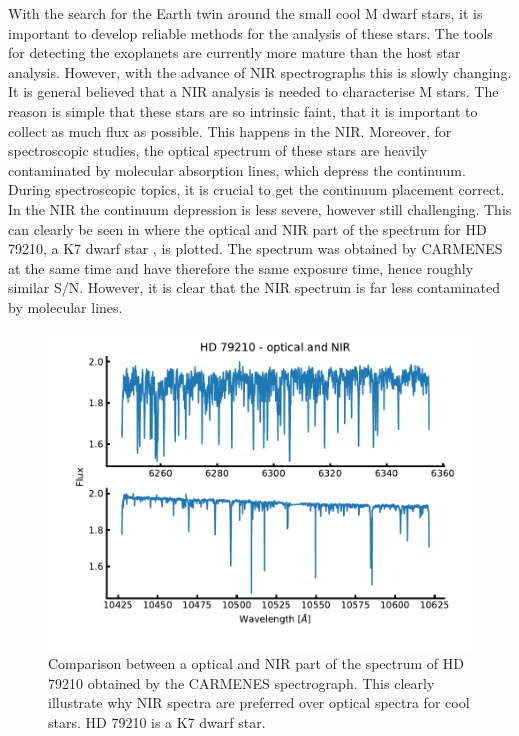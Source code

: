 With the search for the Earth twin around the small cool M dwarf stars, it is important to develop
reliable methods for the analysis of these stars. The tools for detecting the exoplanets are
currently more mature than the host star analysis. However, with the advance of NIR spectrographs
this is slowly changing. It is general believed that a NIR analysis is needed to characterise M
stars. The reason is simple that these stars are so intrinsic faint, that it is important to collect
as much flux as possible. This happens in the NIR. Moreover, for spectroscopic studies, the optical
spectrum of these stars are heavily contaminated by molecular absorption lines, which depress the
continuum. During spectroscopic topics, it is crucial to get the continuum placement correct. In the
NIR the continuum depression is less severe, however still challenging. This can clearly be seen in
 where the optical and NIR part of the spectrum for HD 79210, a K7 dwarf star
\citep{Kirkpatrick1991}, is plotted. The spectrum was obtained by CARMENES at the same time and have
therefore the same exposure time, hence roughly similar S/N. However, it is clear that the NIR
spectrum is far less contaminated by molecular lines.

\begin{figure}[htpb!]
    \centering
    \includegraphics[width=1.0\linewidth]{figures/opticalVSnir.pdf}
    \caption{Comparison between a optical and NIR part of the spectrum of HD 79210 obtained by
             the CARMENES spectrograph. This clearly illustrate why NIR spectra are preferred over
             optical spectra for cool stars. HD 79210 is a K7 dwarf star.}
    \label{fig:opticalVSnir}
\end{figure}

